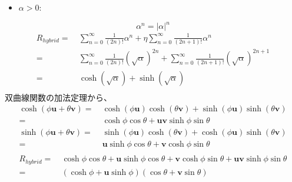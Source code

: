 \documentclass[a4paper,12pt,notitlepage]{jsreport}
\begin{document}
\begin{itemize}
  \item $ \alpha > 0 : $
\end{itemize}
\begin{equation}
  \alpha^n = |\alpha|^n
\end{equation}
\begin{equation}
  \begin{split}
    R_{hybrid} = ~ & \sum_{n=0}^{∞} \frac{1}{(2n)!} \alpha^n
    + \eta \sum_{n=0}^{∞} \frac{1}{(2n + 1)!} \alpha^n \\
    = ~ & \sum_{n=0}^{∞} \frac{1}{(2n)!} (\sqrt{\alpha})^{2n}
    + \sum_{n=0}^{∞} \frac{1}{(2n + 1)!} (\sqrt{\alpha})^{2n + 1} \\
    = ~ & \cosh(\sqrt{\alpha}) + \sinh(\sqrt{\alpha}) \\
  \end{split}
\end{equation}
双曲線関数の加法定理から、
\begin{equation}
  \begin{split}
    \cosh(\phi \bm{u} + \theta \bm{v})
    = ~ & \cosh(\phi \bm{u}) \cosh(\theta \bm{v}) + \sinh(\phi \bm{u}) \sinh(\theta \bm{v}) \\
    = ~ & \cosh \phi \cos \theta + \bm{u} \bm{v} \sinh \phi \sin \theta \\
    \sinh(\phi \bm{u} + \theta \bm{v})
    = ~ & \sinh(\phi \bm{u}) \cosh(\theta \bm{v}) + \cosh(\phi \bm{u}) \sinh(\theta \bm{v}) \\
    = ~ & \bm{u} \sinh \phi \cos \theta + \bm{v} \cosh \phi \sin \theta \\
  \end{split}
\end{equation}
\begin{equation}
  \begin{split}
    R_{hybrid} = ~ & \cosh \phi \cos \theta + \bm{u} \sinh \phi \cos \theta 
    + \bm{v} \cosh \phi \sin \theta + \bm{u} \bm{v} \sinh \phi \sin \theta \\
    = ~ & (\cosh \phi + \bm{u} \sinh \phi)(\cos \theta + \bm{v} \sin \theta) \\
  \end{split}
\end{equation}
\end{document}
